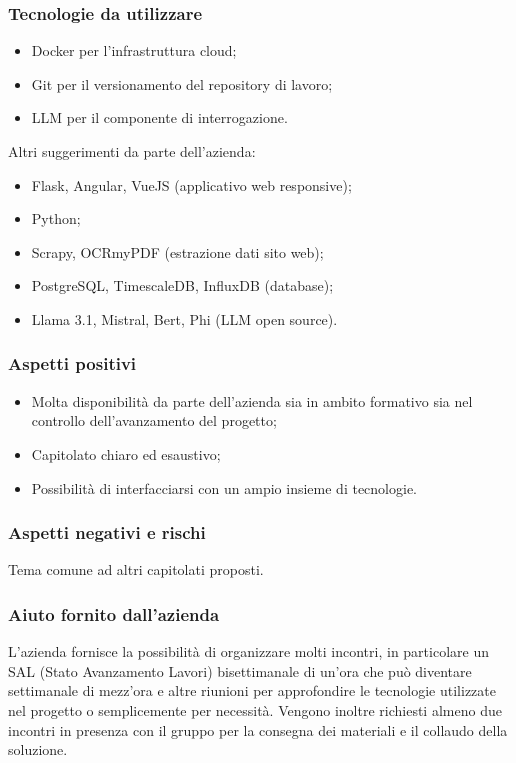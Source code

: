 \documentclass[10pt]{article}
\begin{document}
\subsubsection{Tecnologie da utilizzare}
\begin{itemize}
\item Docker per l’infrastruttura cloud;
\item Git per il versionamento del repository di lavoro;
\item LLM per il componente di interrogazione.
\end{itemize}
Altri suggerimenti da parte dell’azienda:
\begin{itemize}
\item Flask, Angular, VueJS (applicativo web responsive);
\item Python;
\item Scrapy, OCRmyPDF (estrazione dati sito web);
\item PostgreSQL, TimescaleDB, InfluxDB (database);
\item Llama 3.1, Mistral, Bert, Phi (LLM open source).
\end{itemize}

\subsubsection{Aspetti positivi}
\begin{itemize}
    \item Molta disponibilità da parte dell’azienda sia in ambito formativo sia nel controllo dell’avanzamento del progetto;
\item Capitolato chiaro ed esaustivo;
\item Possibilità di interfacciarsi con un ampio insieme di tecnologie.

\end{itemize}
\subsubsection{Aspetti negativi e rischi}
Tema comune ad altri capitolati proposti.
\subsubsection{Aiuto fornito dall'azienda}
L’azienda fornisce la possibilità di organizzare molti incontri, in particolare un SAL (Stato Avanzamento Lavori) bisettimanale di un’ora che può diventare settimanale di mezz’ora e altre riunioni per approfondire le tecnologie utilizzate nel progetto o semplicemente per necessità. Vengono inoltre richiesti almeno due incontri in presenza con il gruppo per la consegna dei materiali e il collaudo della soluzione.
\end{document}
